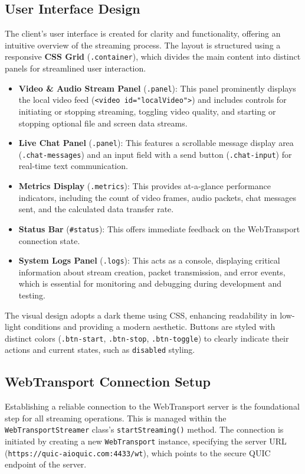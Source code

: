 \subsection{User Interface Design}
The client's user interface is created for clarity and functionality, offering an intuitive overview of the streaming process. The layout is structured using a responsive \textbf{CSS Grid} (\texttt{.container}), which divides the main content into distinct panels for streamlined user interaction.

\begin{itemize}
    \item \textbf{Video \& Audio Stream Panel} (\texttt{.panel}): This panel prominently displays the local video feed (\texttt{<video id="localVideo">}) and includes controls for initiating or stopping streaming, toggling video quality, and starting or stopping optional file and screen data streams.
    \item \textbf{Live Chat Panel} (\texttt{.panel}): This features a scrollable message display area (\texttt{.chat-messages}) and an input field with a send button (\texttt{.chat-input}) for real-time text communication.
    \item \textbf{Metrics Display} (\texttt{.metrics}): This provides at-a-glance performance indicators, including the count of video frames, audio packets, chat messages sent, and the calculated data transfer rate.
    \item \textbf{Status Bar} (\texttt{\#status}): This offers immediate feedback on the WebTransport connection state.
    \item \textbf{System Logs Panel} (\texttt{.logs}): This acts as a console, displaying critical information about stream creation, packet transmission, and error events, which is essential for monitoring and debugging during development and testing.
\end{itemize}

The visual design adopts a dark theme using CSS, enhancing readability in low-light conditions and providing a modern aesthetic. Buttons are styled with distinct colors (\texttt{.btn-start}, \texttt{.btn-stop}, \texttt{.btn-toggle}) to clearly indicate their actions and current states, such as \texttt{disabled} styling.

\subsection{WebTransport Connection Setup}
Establishing a reliable connection to the WebTransport server is the foundational step for all streaming operations. This is managed within the \texttt{WebTransportStreamer} class's \texttt{startStreaming()} method. The connection is initiated by creating a new \texttt{WebTransport} instance, specifying the server URL (\texttt{https://quic-aioquic.com:4433/wt}), which points to the secure QUIC endpoint of the server.

